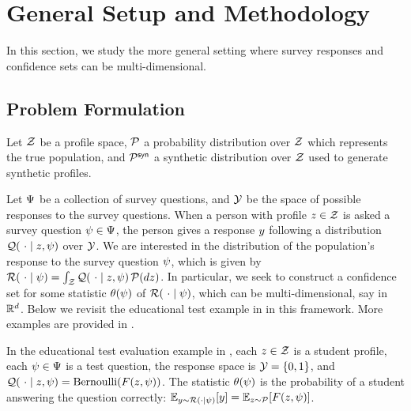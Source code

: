 \section{General Setup and Methodology}\label{sec-general}

In this section, we study the more general setting where survey responses and confidence sets can be multi-dimensional.


\subsection{Problem Formulation}

Let $\mathcal{Z}$ be a profile space, $\mathcal{P}$ a probability distribution over $\mathcal{Z}$ which represents the true population, and $\mathcal{P}^{\mathsf{syn}}$ a synthetic distribution over $\mathcal{Z}$ used to generate synthetic profiles. 

Let $\Psi$ be a collection of survey questions, and $\mathcal{Y}$ be the space of possible responses to the survey questions. When a person with profile $z\in\mathcal{Z}$ is asked a survey question $\psi\in\Psi$, the person gives a response $y$ following a distribution $\mathcal{Q}( ~ \cdot \mid z, \psi)$ over $\mathcal{Y}$. We are interested in the distribution of the population's response to the survey question $\psi$, which is given by $\mathcal{R}(~ \cdot \mid \psi )
=
\int_{\mathcal{Z}} \mathcal{Q}( ~ \cdot \mid z, \psi) \, \mathcal{P} ( d z )$. In particular, we seek to construct a confidence set for some statistic $\theta( \psi )$ of $\mathcal{R}(~ \cdot \mid \psi )$, which can be multi-dimensional, say in $\mathbb{R}^d$. Below we revisit the educational test example in  in this framework. More examples are provided in .

\begin{example}\label{example-education}
In the educational test evaluation example in , each $z\in\mathcal{Z}$ is a student profile, each $\psi\in\Psi$ is a test question, the response space is $\mathcal{Y}=\{0,1\}$, and $\mathcal{Q}( ~ \cdot \mid z, \psi) = \mathrm{Bernoulli} ( F( z , \psi) )$. The statistic $\theta( \psi )$ is the probability of a student answering the question correctly: $\mathbb{E}_{y \sim \mathcal{R}( \cdot \mid \psi )} [ y ] = \mathbb{E}_{z \sim \mathcal{P}} [ F( z , \psi) ]$.
\end{example}

